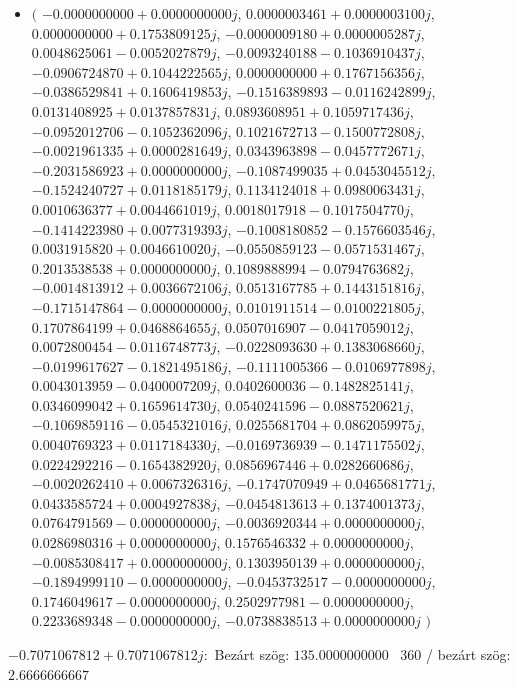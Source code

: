 \documentclass[14pt,a4paper]{article}
\begin{document}
\begin{itemize}
\item
$\big($
$-0.0000000000+0.0000000000j$, $0.0000003461+0.0000003100j$, $0.0000000000+0.1753809125j$, $-0.0000009180+0.0000005287j$, $0.0048625061-0.0052027879j$, $-0.0093240188-0.1036910437j$, $-0.0906724870+0.1044222565j$, $0.0000000000+0.1767156356j$, $-0.0386529841+0.1606419853j$, $-0.1516389893-0.0116242899j$, $0.0131408925+0.0137857831j$, $0.0893608951+0.1059717436j$, $-0.0952012706-0.1052362096j$, $0.1021672713-0.1500772808j$, $-0.0021961335+0.0000281649j$, $0.0343963898-0.0457772671j$, $-0.2031586923+0.0000000000j$, $-0.1087499035+0.0453045512j$, $-0.1524240727+0.0118185179j$, $0.1134124018+0.0980063431j$, $0.0010636377+0.0044661019j$, $0.0018017918-0.1017504770j$, $-0.1414223980+0.0077319393j$, $-0.1008180852-0.1576603546j$, $0.0031915820+0.0046610020j$, $-0.0550859123-0.0571531467j$, $0.2013538538+0.0000000000j$, $0.1089888994-0.0794763682j$, $-0.0014813912+0.0036672106j$, $0.0513167785+0.1443151816j$, $-0.1715147864-0.0000000000j$, $0.0101911514-0.0100221805j$, $0.1707864199+0.0468864655j$, $0.0507016907-0.0417059012j$, $0.0072800454-0.0116748773j$, $-0.0228093630+0.1383068660j$, $-0.0199617627-0.1821495186j$, $-0.1111005366-0.0106977898j$, $0.0043013959-0.0400007209j$, $0.0402600036-0.1482825141j$, $0.0346099042+0.1659614730j$, $0.0540241596-0.0887520621j$, $-0.1069859116-0.0545321016j$, $0.0255681704+0.0862059975j$, $0.0040769323+0.0117184330j$, $-0.0169736939-0.1471175502j$, $0.0224292216-0.1654382920j$, $0.0856967446+0.0282660686j$, $-0.0020262410+0.0067326316j$, $-0.1747070949+0.0465681771j$, $0.0433585724+0.0004927838j$, $-0.0454813613+0.1374001373j$, $0.0764791569-0.0000000000j$, $-0.0036920344+0.0000000000j$, $0.0286980316+0.0000000000j$, $0.1576546332+0.0000000000j$, $-0.0085308417+0.0000000000j$, $0.1303950139+0.0000000000j$, $-0.1894999110-0.0000000000j$, $-0.0453732517-0.0000000000j$, $0.1746049617-0.0000000000j$, $0.2502977981-0.0000000000j$, $0.2233689348-0.0000000000j$, $-0.0738838513+0.0000000000j$
$\big)$
\end{itemize}
$-0.7071067812+0.7071067812j$:\
Bezárt szög: $135.0000000000$ \
360 / bezárt szög: $2.6666666667$\
\end{document}
